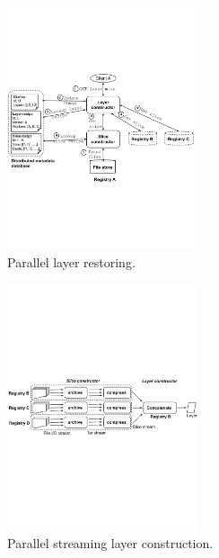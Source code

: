 \begin{figure}[t]
	\centering
	\centering
	\includegraphics[width=0.49\textwidth]{graphs/sys-architecture-layer-miss.pdf}
	\caption{Parallel layer restoring.}
	\label{fig:restoring}
\end{figure} 

\begin{figure}[t]
	\centering
	\centering
	\includegraphics[width=0.5\textwidth]{graphs/sift-layer-construct.pdf}
	\caption{Parallel streaming layer construction.}
	\label{fig:construct}
\end{figure}

